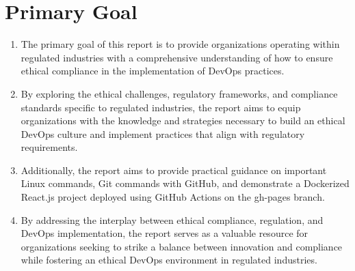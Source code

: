 \chapter{Primary Goal}

\begin{enumerate}
    \item The primary goal of this report is to provide organizations operating within regulated industries with a comprehensive understanding of how to ensure ethical compliance in the implementation of DevOps practices.

    \item By exploring the ethical challenges, regulatory frameworks, and compliance standards specific to regulated industries, the report aims to equip organizations with the knowledge and strategies necessary to build an ethical DevOps culture and implement practices that align with regulatory requirements.

    \item Additionally, the report aims to provide practical guidance on important Linux commands, Git commands with GitHub, and demonstrate a Dockerized React.js project deployed using GitHub Actions on the gh-pages branch.

    \item By addressing the interplay between ethical compliance, regulation, and DevOps implementation, the report serves as a valuable resource for organizations seeking to strike a balance between innovation and compliance while fostering an ethical DevOps environment in regulated industries.
\end{enumerate}